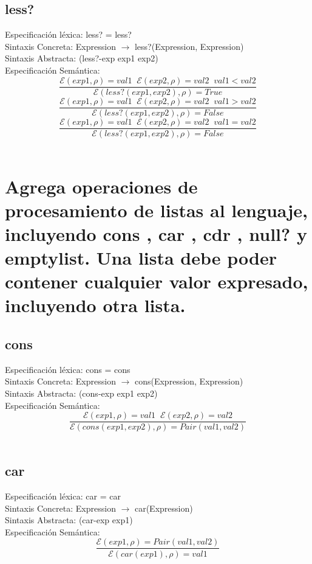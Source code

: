 \documentclass{article}
\begin{document}
\subsection{less?}
Especificación léxica:
less? = less?
\\
Sintaxis Concreta:
Expression $\rightarrow$ less?(Expression, Expression)
\\
Sintaxis Abstracta:
(less?-exp exp1 exp2)
\\
Especificación Semántica:
$$\frac{\mathcal{E} (exp1, \rho) = val1 \;\; \mathcal{E} (exp2, \rho) = val2 \;\; val1 < val2}{\mathcal{E} (less?(exp1, exp2), \rho ) = True}$$
$$\frac{\mathcal{E} (exp1, \rho) = val1 \;\; \mathcal{E} (exp2, \rho) = val2 \;\; val1 > val2}{\mathcal{E} (less?(exp1, exp2), \rho ) = False}$$
$$\frac{\mathcal{E} (exp1, \rho) = val1 \;\; \mathcal{E} (exp2, \rho) = val2 \;\; val1 = val2}{\mathcal{E} (less?(exp1, exp2), \rho ) = False}$$
\\

\section{Agrega operaciones de procesamiento de listas al lenguaje, incluyendo cons , car , cdr ,
null? y emptylist. Una lista debe poder contener cualquier valor expresado, incluyendo
otra lista.}
\subsection{cons}
Especificación léxica:
cons = cons
\\
Sintaxis Concreta:
Expression $\rightarrow$ cons(Expression, Expression)
\\
Sintaxis Abstracta:
(cons-exp exp1 exp2)
\\
Especificación Semántica:
$$\frac{\mathcal{E} (exp1, \rho) = val1 \;\; \mathcal{E} (exp2, \rho) = val2}{\mathcal{E} (cons(exp1, exp2), \rho ) = Pair(val1, val2)}$$
\\
\subsection{car}
Especificación léxica:
car = car
\\
Sintaxis Concreta:
Expression $\rightarrow$ car(Expression)
\\
Sintaxis Abstracta:
(car-exp exp1)
\\
Especificación Semántica:
$$\frac{\mathcal{E} (exp1, \rho) = Pair(val1, val2)}{\mathcal{E} (car(exp1), \rho ) = val1}$$
\\
\end{document}
